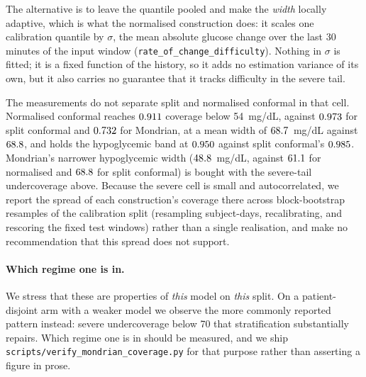 The alternative is to leave the quantile pooled and make the \emph{width}
locally adaptive, which is what the normalised construction does: it scales one
calibration quantile by $\sigma$, the mean absolute glucose change over the last
30 minutes of the input window (\texttt{rate\_of\_change\_difficulty}). Nothing
in $\sigma$ is fitted; it is a fixed function of the history, so it adds no
estimation variance of its own, but it also carries no guarantee that it tracks
difficulty in the severe tail.

The measurements do not separate split and normalised conformal in that cell. Normalised
conformal reaches $0.911$ coverage below 54~mg/dL, against
$0.973$ for split conformal and $0.732$ for
Mondrian, at a mean width of $68.7$~mg/dL against $68.8$, and
holds the hypoglycemic band at $0.950$ against split conformal's
$0.985$. Mondrian's narrower hypoglycemic width
($48.8$~mg/dL, against $61.1$ for normalised and
$68.8$ for split conformal) is bought with the
severe-tail undercoverage above. Because the severe cell is small and
autocorrelated, we report the spread of each construction's coverage there
across block-bootstrap resamples of the calibration split (resampling
subject-days, recalibrating, and rescoring the fixed test windows) rather than a
single realisation, and make no recommendation that this spread does not
support.

\paragraph{Which regime one is in.}
We stress that these are properties of \emph{this} model on \emph{this} split.
On a patient-disjoint arm with a weaker model we observe the more commonly
reported pattern instead: severe undercoverage below 70 that stratification
substantially repairs. Which regime one is in should be measured, and we ship
\texttt{scripts/verify\_mondrian\_coverage.py} for that purpose rather than
asserting a figure in prose.
